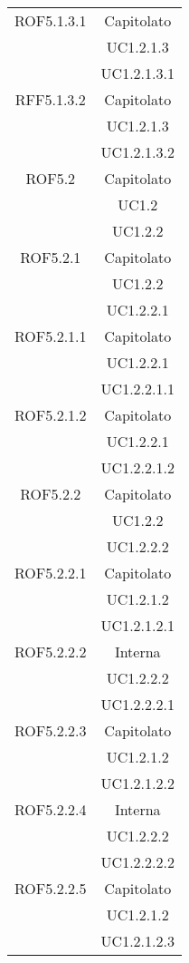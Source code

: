 \begin{longtable}{|c|c|}
\midrule
ROF5.1.3.1
& Capitolato\\
& UC1.2.1.3\\
& UC1.2.1.3.1\\

\midrule
RFF5.1.3.2
& Capitolato\\
& UC1.2.1.3\\
& UC1.2.1.3.2\\

\midrule
ROF5.2
& Capitolato\\
& UC1.2\\
& UC1.2.2\\

\midrule
ROF5.2.1
& Capitolato\\
& UC1.2.2\\
& UC1.2.2.1\\

\midrule
ROF5.2.1.1
& Capitolato\\
& UC1.2.2.1\\
& UC1.2.2.1.1\\

\midrule
ROF5.2.1.2
& Capitolato\\
& UC1.2.2.1\\
& UC1.2.2.1.2\\

\midrule
ROF5.2.2
& Capitolato\\
& UC1.2.2\\
& UC1.2.2.2\\

\midrule
ROF5.2.2.1
& Capitolato\\
& UC1.2.1.2\\
& UC1.2.1.2.1\\

\midrule
ROF5.2.2.2
& Interna\\
& UC1.2.2.2\\
& UC1.2.2.2.1\\

\midrule
ROF5.2.2.3
& Capitolato\\
& UC1.2.1.2\\
& UC1.2.1.2.2\\

\midrule
ROF5.2.2.4
& Interna\\
& UC1.2.2.2\\
& UC1.2.2.2.2\\

\midrule
ROF5.2.2.5
& Capitolato\\
& UC1.2.1.2\\
& UC1.2.1.2.3\\


\end{longtable}
